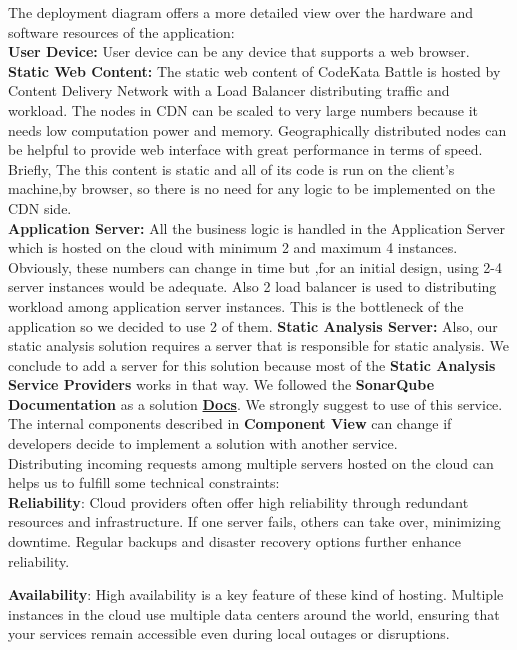 The deployment diagram offers a more detailed view over the hardware and software resources of the application:
\\
\indent \textbf{User Device:} User device can be any device that supports a web browser.
\\
\indent \textbf{Static Web Content:} The static web content of CodeKata Battle is hosted by Content Delivery Network with a Load Balancer distributing traffic and workload. The nodes in CDN can be scaled to very large numbers because it needs low computation power and memory. Geographically distributed nodes can be helpful to provide web interface with great performance in terms of speed. Briefly, The this content is static and all of its code is run on the
client’s machine,by browser, so there is no need for any logic to be implemented on the CDN side.
\\
\indent \textbf{Application Server:} All the business logic is handled in the Application Server which is hosted on the cloud with minimum 2 and maximum 4 instances. Obviously, these numbers can change in time but ,for an initial design, using 2-4 server instances would be adequate. Also 2 load balancer is used to distributing workload among application server instances. This is the bottleneck of the application so we decided to use 2 of them. 
\indent \textbf{Static Analysis Server:} Also, our static analysis solution requires a server that is responsible for static analysis. We conclude to add a server for this solution because most of the \textbf{Static Analysis Service Providers} works in that way. We followed the \textbf{SonarQube Documentation} as a solution  \hyperlink{https://docs.sonarsource.com/sonarqube/9.9/setup-and-upgrade/install-the-server/}{\textbf{Docs}}. We strongly suggest to use of this service. The internal components described in \textbf{Component View} can change if developers decide to implement a solution with another service.
\\
\indent Distributing incoming requests among multiple servers hosted on the cloud can helps us to fulfill some technical constraints:
\\
\indent \textbf{Reliability}: Cloud providers often offer high reliability through redundant resources and infrastructure. If one server fails, others can take over, minimizing downtime. Regular backups and disaster recovery options further enhance reliability.

\indent \textbf{Availability}: High availability is a key feature of these kind of hosting. Multiple instances in the cloud use multiple data centers around the world, ensuring that your services remain accessible even during local outages or disruptions.

